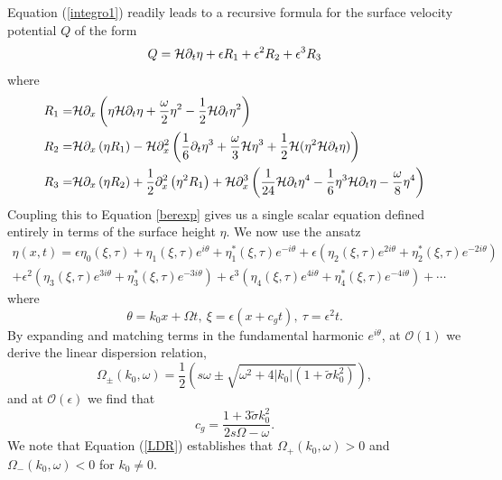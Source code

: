 \documentclass{JFM_Style/jfm}
\begin{document}
Equation (\ref{integro1}) readily leads to a recursive formula for the surface velocity potential $Q$ of the form 
\begin{equation}
Q = \mathcal{H}\partial_{t}\eta + \epsilon R_{1} + \epsilon^{2} R_{2} + \epsilon^{3} R_{3}
\label{Qexp}
\end{equation}
where
\begin{align*}
R_{1}= & \mathcal{H}\partial_{x}\left(\eta\mathcal{H}\partial_{t}\eta+ \frac{\omega}{2}\eta^{2} - \frac{1}{2}\mathcal{H}\partial_{t}\eta^{2} \right)\\
R_{2}= & \mathcal{H}\partial_{x}\left(\eta R_{1} \right) - \mathcal{H}\partial_{x}^{2}\left(\frac{1}{6}\partial_{t}\eta^{3} + \frac{\omega}{3}\mathcal{H}\eta^{3} + \frac{1}{2}\mathcal{H}(\eta^{2}\mathcal{H}\partial_{t}\eta)\right)\\
R_{3} = & \mathcal{H}\partial_{x}\left(\eta R_{2} \right) + \frac{1}{2}\partial_{x}^{2}\left(\eta^{2}R_{1}\right) + \mathcal{H}\partial_{x}^{3}\left(\frac{1}{24}\mathcal{H}\partial_{t}\eta^{4} - \frac{1}{6}\eta^{3}\mathcal{H}\partial_{t}\eta - \frac{\omega}{8}\eta^{4}\right)  
\end{align*}
Coupling this to Equation \eqref{berexp} gives us a single scalar equation defined entirely in terms of the surface height $\eta$.  We now use the ansatz
\begin{multline}
\eta(x,t) = \epsilon \eta_{0}(\xi,\tau) + \eta_{1}(\xi,\tau)e^{i\theta} +  \eta_{1}^{\ast}(\xi,\tau)e^{-i\theta} + \epsilon\left(\eta_{2}(\xi,\tau)e^{2i\theta} +  \eta_{2}^{\ast}(\xi,\tau)e^{-2i\theta}\right) \\
+ \epsilon^{2}\left(\eta_{3}(\xi,\tau)e^{3i\theta} +  \eta_{3}^{\ast}(\xi,\tau)e^{-3i\theta}\right)  + \epsilon^{3}\left(\eta_{4}(\xi,\tau)e^{4i\theta} +  \eta_{4}^{\ast}(\xi,\tau)e^{-4i\theta}\right) + \cdots
\label{nlssurfexp}
\end{multline}
where
\[
\theta = k_{0}x + \Omega t, ~ \xi = \epsilon(x + c_{g}t), ~ \tau = \epsilon^{2}t.
\]
By expanding and matching terms in the fundamental harmonic $e^{i\theta}$, at $\mathcal{O}(1)$ we derive the linear dispersion relation,
\begin{equation}
\Omega_{\pm}(k_{0},\omega)  = \frac{1}{2}\left(s\omega \pm \sqrt{\omega^{2} + 4|k_{0}|(1+\tilde{\sigma}k_{0}^{2})}\right),
\label{LDR}
\end{equation}
and at $\mathcal{O}(\epsilon)$ we find that 
\[
c_{g} = \frac{1+3\tilde{\sigma}k_{0}^{2}}{2s\Omega - \omega}.
\]
We note that Equation (\ref{LDR}) establishes that $\Omega_{+}(k_{0},\omega) > 0$ and $\Omega_{-}(k_{0},\omega) < 0$ for $k_{0}\neq0$.  
\end{document}
